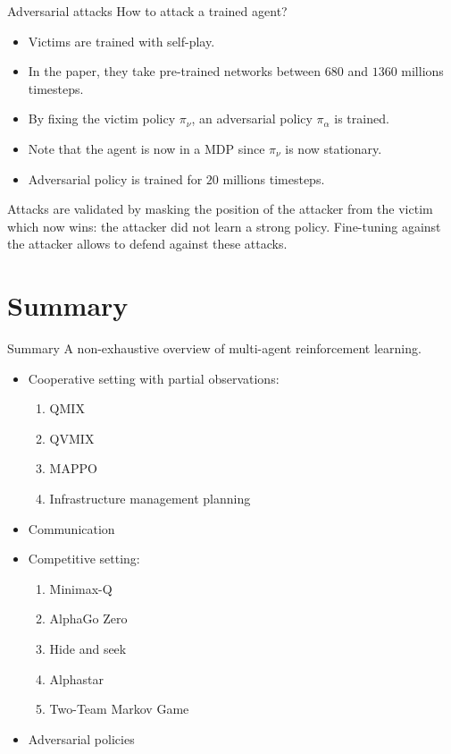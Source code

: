 \documentclass[9pt, hyperref={pdfusetitle,colorlinks=true,allcolors=DarkBlue}]{beamer}
\begin{document}
\begin{frame}{Adversarial attacks}
How to attack a trained agent?
\begin{itemize}
    \item Victims are trained with self-play.
    \item In the paper, they take pre-trained networks between $680$ and $1360$ millions timesteps.
    \item By fixing the victim policy $\pi_\nu$, an adversarial policy $\pi_\alpha$ is trained.
    \item Note that the agent is now in a MDP since $\pi_\nu$ is now stationary.
    \item Adversarial policy is trained for $20$ millions timesteps.
\end{itemize}
\vfill
Attacks are validated by masking the position of the attacker from the victim which now wins: the attacker did not learn a strong policy.
\vfill
Fine-tuning against the attacker allows to defend against these attacks.
\end{frame}
\section{Summary}
\begin{frame}{Summary}
A non-exhaustive overview of multi-agent reinforcement learning.
\begin{itemize}
    \item Cooperative setting with partial observations:
    \begin{enumerate}
        \item QMIX
        \item QVMIX
        \item MAPPO
        \item Infrastructure management planning
    \end{enumerate}
    \item Communication
    \item Competitive setting:
    \begin{enumerate}
        \item Minimax-Q
        \item AlphaGo Zero
        \item Hide and seek
        \item Alphastar
        \item Two-Team Markov Game
    \end{enumerate}
    \item Adversarial policies
\end{itemize}
\end{frame}
\end{document}
